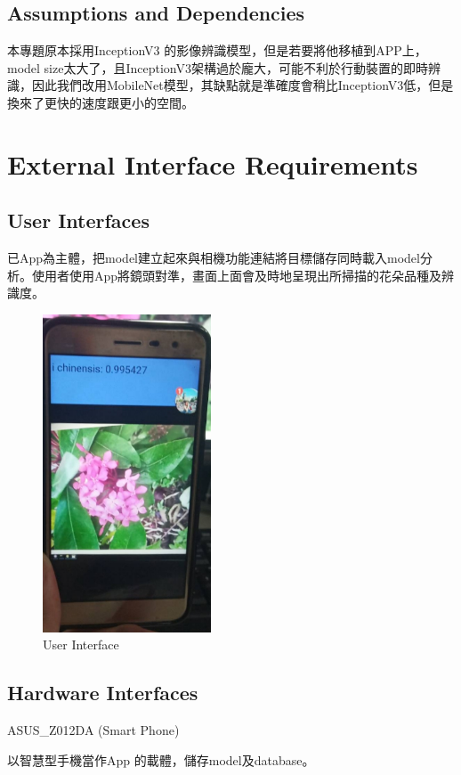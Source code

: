 \documentclass{scrreprt}
\begin{document}
\section{Assumptions and Dependencies}
\begin{CJK}{UTF8}{bkai}
	本專題原本採用InceptionV3 的影像辨識模型，但是若要將他移植到APP上，model size太大了，且InceptionV3架構過於龐大，可能不利於行動裝置的即時辨識，因此我們改用MobileNet模型，其缺點就是準確度會稍比InceptionV3低，但是換來了更快的速度跟更小的空間。
\end{CJK}


\chapter{External Interface Requirements}

\section{User Interfaces}
\begin{CJK}{UTF8}{bkai}
		已App為主體，把model建立起來與相機功能連結將目標儲存同時載入model分析。使用者使用App將鏡頭對準，畫面上面會及時地呈現出所掃描的花朵品種及辨識度。
\end{CJK}
\begin{figure}[h]
\begin{center}
\includegraphics[width=5cm]{userinterface1.jpg}
\end{center}
\caption{User Interface}
\end{figure}

\section{Hardware Interfaces}
ASUS_Z012DA (Smart Phone)  \\
\begin{CJK}{UTF8}{bkai}
		以智慧型手機當作App 的載體，儲存model及database。
\end{CJK}
\end{document}
